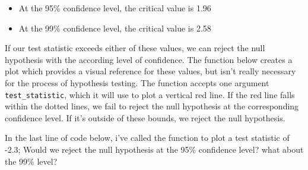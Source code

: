 \documentclass[
  letterpaper,
  DIV=11,
  numbers=noendperiod]{scrreprt}
\providecommand{\tightlist}{%
  \setlength{\itemsep}{0pt}\setlength{\parskip}{0pt}}\usepackage{longtable,booktabs,array}
\begin{document}
\begin{itemize}
\tightlist
\item
  At the 95\% confidence level, the critical value is 1.96
\item
  At the 99\% confidence level, the critical value is 2.58
\end{itemize}

If our test statistic exceeds either of these values, we can reject the
null hypothesis with the according level of confidence. The function
below creates a plot which provides a visual reference for these values,
but isn't really necessary for the process of hypothesis testing. The
function accepts one argument \texttt{test\_statistic}, which it will
use to plot a vertical red line. If the red line falls within the dotted
lines, we fail to reject the null hypothesis at the corresponding
confidence level. If it's outside of these bounds, we reject the null
hypothesis.

In the last line of code below, i've called the function to plot a test
statistic of -2.3; Would we reject the null hypothesis at the 95\%
confidence level? what about the 99\% level?
\end{document}
